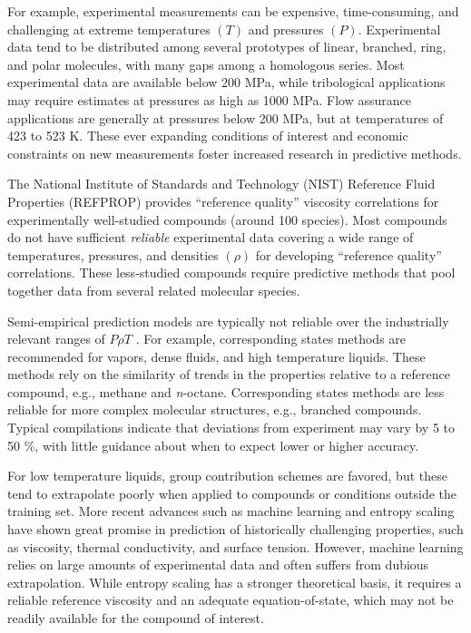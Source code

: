 \documentclass[preprint,review,12pt]{elsarticle}
\begin{document}
	For example, experimental measurements can be expensive, time-consuming, and challenging at extreme temperatures $(T)$ and pressures $(P)$. Experimental data tend to be distributed among several prototypes of linear, branched, ring, and polar molecules, with many gaps among a homologous series. Most experimental data are available below 200 MPa, while tribological applications may require estimates at pressures as high as 1000 MPa. Flow assurance applications are generally at pressures below 200 MPa, but at temperatures of 423 to 523 K. These ever expanding conditions of interest and economic constraints on new measurements foster increased research in predictive methods.
	
	
    
    The National Institute of Standards and Technology (NIST) Reference Fluid Properties (REFPROP) provides ``reference quality'' viscosity correlations for experimentally well-studied compounds (around 100 species). Most compounds do not have sufficient \textit{reliable} experimental data covering a wide range of temperatures, pressures, and densities $(\rho)$ for developing ``reference quality'' correlations. These less-studied compounds require predictive methods that pool together data from several related molecular species. 
    
    Semi-empirical prediction models are typically not reliable over the industrially relevant ranges of $P \rho T$ \cite{PGL}. For example, corresponding states methods are recommended for vapors, dense fluids, and high temperature liquids. These methods rely on the similarity of trends in the properties relative to a reference compound, e.g., methane and \textit{n}-octane. Corresponding states methods are less reliable for more complex molecular structures, e.g., branched compounds. Typical compilations indicate that deviations from experiment may vary by 5 to 50 \%, with little guidance about when to expect lower or higher accuracy. 
    
    For low temperature liquids, group contribution schemes are favored, but these tend to extrapolate poorly when applied to compounds or conditions outside the training set. More recent advances such as machine learning \cite{Mulero2017,Lee2017} and entropy scaling \cite{Lotgering2015} have shown great promise in prediction of historically challenging properties, such as viscosity, thermal conductivity, and surface tension. However, machine learning relies on large amounts of experimental data and often suffers from dubious extrapolation. While entropy scaling has a stronger theoretical basis, it requires a reliable reference viscosity and an adequate equation-of-state, which may not be readily available for the compound of interest.
	
\end{document}
